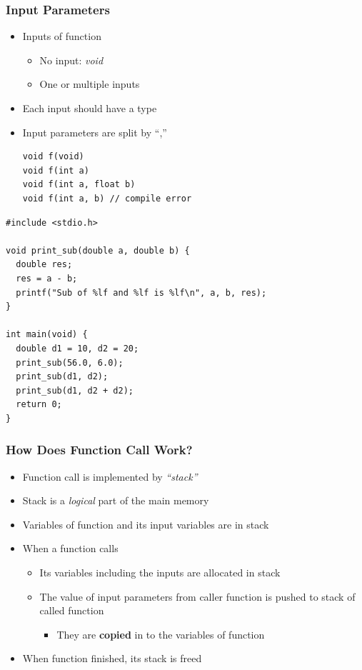 \documentclass{../c-lecture}
\begin{document}
\begin{frame}[fragile]
  \frametitle{Input Parameters}
  \begin{itemize}
    \item Inputs of function
    \begin{itemize}
      \item No input: \textit{\color{YellowOrange} void}
      \item One or multiple inputs
    \end{itemize}
    \item Each input should have a type
    \item Input parameters are split by ``,''
    \begin{verbatim}
void f(void)
void f(int a)
void f(int a, float b)
void f(int a, b) // compile error
    \end{verbatim}
  \end{itemize}
\end{frame}

\begin{frame}[fragile]
  \scriptsize
  \begin{verbatim}
#include <stdio.h>

void print_sub(double a, double b) {
  double res;
  res = a - b;
  printf("Sub of %lf and %lf is %lf\n", a, b, res);
}

int main(void) {
  double d1 = 10, d2 = 20;
  print_sub(56.0, 6.0);
  print_sub(d1, d2);
  print_sub(d1, d2 + d2);
  return 0;
}
  \end{verbatim}
\end{frame}

\begin{frame}
  \frametitle{How Does Function Call Work?}
  \begin{itemize}
    \item
      Function call is implemented by \textit{\color{YellowOrange} ``stack''}
    \item
      Stack is a \textit{\color{LimeGreen} logical} part of the main memory
    \item Variables of function and its input variables are in stack
    \item When a function calls
    \begin{itemize}
      \item Its variables including the inputs are allocated in stack
      \item
        The value of input parameters from caller function is pushed to stack of
        called function
      \begin{itemize}
        \item
          They are \textbf{\color{Cyan} copied} in to the variables of
          function
      \end{itemize}
    \end{itemize}
    \item When function finished, its stack is freed
  \end{itemize}
\end{frame}
\end{document}
